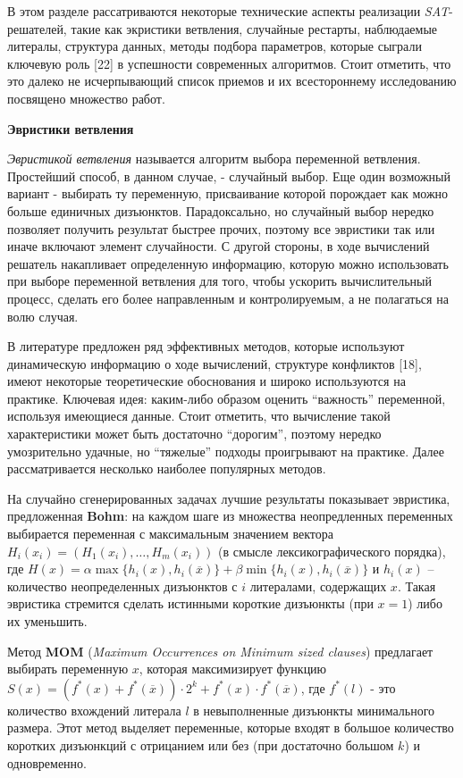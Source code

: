 В этом разделе рассатриваются некоторые технические аспекты реализации \textit{SAT}-решателей, такие как экристики ветвления, случайные рестарты, наблюдаемые литералы, структура данных, методы подбора параметров, которые сыграли ключевую роль [22] в успешности современных алгоритмов. Стоит отметить, что это далеко не исчерпывающий список приемов и их всестороннему исследованию посвящено множество работ.

\textbf{Эвристики ветвления}

\textit{Эвристикой ветвления} называется алгоритм выбора переменной ветвления. Простейший способ, в данном случае, - случайный выбор. Еще один возможный вариант - выбирать ту переменную, присваивание которой порождает как можно больше единичных дизъюнктов.
Парадоксально, но случайный выбор нередко позволяет получить результат быстрее прочих, поэтому все эвристики так или иначе включают элемент случайности. 
С другой стороны, в ходе вычислений решатель накапливает определенную информацию, которую можно использовать при выборе переменной ветвления для того, чтобы ускорить вычислительный процесс, сделать его более направленным и контролируемым, а не полагаться на волю случая. 

В литературе предложен ряд эффективных методов, которые используют динамическую информацию о ходе вычислений, структуре конфликтов [18], имеют некоторые теоретические обоснования и широко используются на практике. Ключевая идея: каким-либо образом оценить \enquote{важность} переменной, используя имеющиеся данные. Стоит отметить, что вычисление такой характеристики может быть достаточно \enquote{дорогим}, поэтому нередко умозрительно удачные, но \enquote{тяжелые} подходы проигрывают на практике. Далее рассматривается несколько наиболее популярных методов.

На случайно сгенерированных задачах лучшие результаты показывает эвристика, предложенная \textbf{Bohm}: на каждом шаге из множества неопредленных переменных выбирается переменная с максимальным значением вектора 
$H_i(x_i) = \left(H_1(x_i), \dots, H_m(x_i)\right)$ 
(в смысле лексикографического порядка), где
$H(x) = \alpha \max \{ h_i(x), h_i(\overline{x}) \} + \beta \min \{ h_i(x), h_i(\overline{x}) \}$
и $h_i(x)$ – количество неопределенных дизъюнктов с $i$ литералами, содержащих $x$.
Такая эвристика стремится сделать истинными короткие дизъюнкты (при $x=1$) либо их уменьшить.

Метод \textbf{MOM} (\textit{Maximum Occurrences on Minimum sized clauses}) предлагает выбирать переменную $x$, которая максимизирует функцию 
$S(x) = \left(f^{*}(x) + f^{*}(\overline{x})\right) \cdot 2^{k} + f^{*}(x) \cdot f^{*}(\overline{x})$, где $f^{*}(l)$ - это количество вхождений литерала $l$ в невыполненные дизъюнкты минимального размера. Этот метод выделяет переменные, которые входят в большое количество коротких дизъюнкций с отрицанием или без (при достаточно большом $k$) и одновременно.

